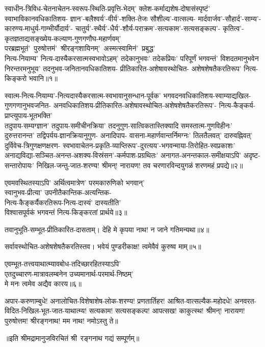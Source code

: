 
\begin{flushleft}
स्वाधीन-त्रिविध-चेतनाचेतन-स्वरूप-स्थिति-प्रवृत्ति-भेदम्'
क्लेश-कर्माद्यशेष-दोषासंस्पृष्टं' स्वाभाविकानवधिकातिशय-
ज्ञान'-बलैश्वर्य'-वीर्य'-शक्ति-तेजः सौशील्य'-वात्सल्य-
मार्दवार्जव'-सौहार्द'-साम्य'-कारुण्य-माधुर्य-गाम्भीर्यौदार्य'-
चातुर्य'-स्थैर्य'-धैर्य'-शौर्य-पराक्रम'-सत्यकाम'-सत्यसङ्कल्प'-
कृतित्व'-कृतज्ञताद्यसङ्ख्येय-कल्याण-गुणगणौघ-महार्णवम्'
\mbox{परब्रह्मभूतं' पुरुषोत्तमं' श्रीरङ्गशायिनम्' अस्मत्स्वामिनं' प्रबुद्ध'}\\
नित्य-नियाम्य' नित्य-दास्यैकरसात्मस्वभावोऽहम्'
तदेकानुभवः' तदेकप्रियः' परिपूर्णं भगवन्तं'
विशदतमानुभवेन निरन्तरमनुभूय' तदनुभव-जनितानवधिकातिशय-%
प्रीतिकारित-अशेषावस्थोचित-
अशेषशेषतैकरतिरूप' नित्य-किङ्करो भवानि॥१॥


स्वात्म-नित्य-नियाम्य'-नित्यदास्यैकरसात्म-स्वभावानुसन्धान-पूर्वक'
भगवदनवधिकातिशय-स्वाम्याद्यखिल-गुणगणानुभवजनित-
अनवधिकातिशय-प्रीतिकारित-अशेषावस्थोचित-अशेषशेषतैकरतिरूप'-%
नित्य-कैङ्कर्य-प्राप्त्युपाय-भूतभक्ति'\\
तदुपाय-सम्यग्ज्ञान' तदुपाय-समीचीनक्रिया'
तदनुगुण-सात्विकतास्तिक्यादि समस्तात्म-गुणविहीनः'
दुरुत्तरानन्त' तद्विपर्यय-ज्ञानक्रियानुगुण-%
अनादिपाप- वासना-महार्णवान्तर्निमग्नः'
तिलतैलवत्' दारुवह्निवत्' दुर्विवेच-त्रिगुणक्षणक्षरण-%
स्वभावाचेतन-प्रकृति-व्याप्तिरूप'-दुरत्यय'-भगवन्माया-तिरोहित-स्वप्रकाशः'
अनाद्यविद्या-सञ्चित-अनन्त-अशक्य-विस्रंसन'-कर्मपाश-प्रग्रथितः'
अनागत-अनन्तकाल-समीक्षयाऽपि' अदृष्ट-सन्तारोपायः'
निखिल-जन्तु-जात-शरण्य! श्रीमन्! नारायण!
तव चरणारविन्दयुगळं शरणमहं प्रपद्ये॥२॥

एवमवस्थितस्याऽपि' अर्थित्वमात्रेण' परमकारुणिको भगवान्'\\
स्वानुभव-प्रीत्या' उपनीतैकान्तिक-अत्यन्तिक-\\
नित्य-कैङ्कर्यैकरतिरूप-नित्य-दास्यं' दास्यतीति' \\
विश्वासपूर्वकं भगवन्तं नित्य-किङ्करतां प्रार्थये॥३॥

तवानुभूति-सम्भूत-प्रीतिकारित-दासताम्।
देहि मे कृपया नाथ! न जाने गतिमन्यथा॥४॥

सर्वावस्थोचित-अशेषशेषतैकरतिस्तव।
भवेयं पुण्डरीकाक्ष! त्वमेवैवं कुरुष्व माम्॥५॥

एवम्भूत-तत्त्वयाथात्म्यावबोध-तदिच्छारहितस्याऽपि'\\
एतदुच्चारण-मात्रावलम्बनेन उच्यमानार्थ-परमार्थ-निष्ठम्'\\
मे मनः त्वमेव अद्यैव कारय॥६॥

अपार-करुणाम्बुधे! अनालोचित-विशेषाशेष-लोक-शरण्य!
प्रणतार्तिहर! आश्रित-वात्सल्यैक-महोदधे! 
अनवरत-विदित-निखिल-भूत-जात-याथात्म्य!
सत्यकाम! सत्यसङ्कल्प! आपत्सख! काकुत्स्थ! श्रीमन्!
नारायण! पुरुषोत्तम! श्रीरङ्गनाथ! मम नाथ! नमोऽस्तु ते॥\\[6mm]
\centerline{॥इति श्रीमद्रामानुजविरचितं श्री~रङ्गनाथ गद्यं सम्पूर्णम्॥}
\end{flushleft}